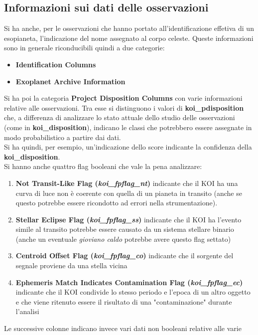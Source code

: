\subsection{Informazioni sui dati delle osservazioni}
Si ha anche, per le osservazioni che hanno portato all'identificazione effetiva di un 
esopianeta, l'indicazione del nome assegnato al corpo celeste. Queste 
informazioni sono in generale riconducibili quindi a due categorie:
\begin{itemize}
    \item \textbf{Identification Columns}
    \item \textbf{Exoplanet Archive Information}
\end{itemize}
Si ha poi la categoria \textbf{Project Disposition Columns} con varie 
informazioni relative alle osservazioni. Tra esse si distinguono i valori di 
\textbf{koi\_pdisposition} che, a differenza di analizzare lo stato attuale 
dello studio delle osservazioni (come in \textbf{koi\_disposition}), 
indicano le classi che potrebbero essere 
assegnate in modo probabilistico a partire dai dati.\\
Si ha quindi, per esempio, un'indicazione dello score indicante la 
confidenza della \textbf{koi\_disposition}.\\
Si hanno anche quattro flag booleani che vale la pena analizzare:
\begin{enumerate}
    \item \textbf{Not Transit-Like Flag (\textit{koi\_fpflag\_nt})} indicante
    che il KOI ha una curva di luce non è coerente con quella di un pianeta in 
    transito (anche se questo potrebbe essere ricondotto ad errori nella 
    strumentazione).
    \item \textbf{Stellar Eclipse Flag (\textit{koi\_fpflag\_ss})} indicante
    che il KOI ha l'evento simile al transito potrebbe essere causato da un 
    sistema stellare binario (anche un eventuale \textit{gioviano caldo} 
    potrebbe avere questo flag settato)
    \item \textbf{Centroid Offset Flag (\textit{koi\_fpflag\_co})} indicante
    che il sorgente del segnale proviene da una stella vicina
    \item \textbf{Ephemeris Match Indicates Contamination Flag
    (\textit{koi\_fpflag\_ec})} indicante che il KOI condivide lo stesso periodo
    e l'epoca di un altro oggetto e che viene ritenuto essere il risultato di
    una "contaminazione" durante l'analisi
\end{enumerate}
Le successive colonne indicano invece vari dati non booleani relative alle varie 
